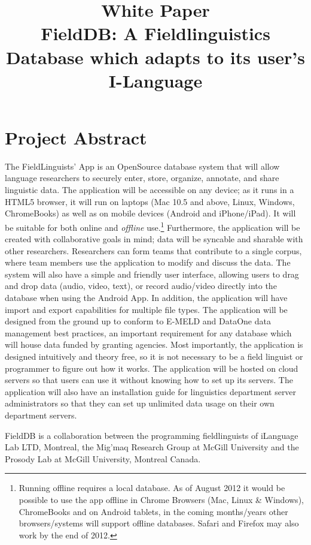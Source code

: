 \documentclass[12 pt]{article}
\title{White Paper \\ FieldDB: A Fieldlinguistics Database which adapts to its user's I-Language}
\author{}
\date{}
\begin{document}
\maketitle{} 

\tableofcontents

\section {Project Abstract}

The FieldLinguists' App is an OpenSource database system that will allow language researchers to securely enter, store, organize, annotate, and share linguistic data. The application will be accessible on any device; as it runs in a HTML5 browser, it will run on laptops (Mac  10.5 and above, Linux, Windows, ChromeBooks) as well as on mobile devices (Android and iPhone/iPad).  It will be suitable for both online and \emph{offline} use.\footnote{Running offline requires  a local database. As of August 2012 it would be possible to use the app offline in Chrome Browsers (Mac, Linux \& Windows), ChromeBooks and on Android tablets, in the coming months/years other browsers/systems will support offline databases. Safari and Firefox may also work by the end of 2012.}  Furthermore, the application will be created with collaborative goals in mind;  data will be syncable and sharable with other researchers.  Researchers can form teams that contribute to a single corpus, where team members use the application to modify and discuss the data. The system will also have a simple and friendly user interface, allowing users to drag and drop data (audio, video, text), or record audio/video directly into the database when using the Android App. In addition, the application will have import and export capabilities for multiple file types. The application will be designed from the ground up to conform to E-MELD and DataOne data management best practices, an important requirement for any database which will house data funded by granting agencies.  Most importantly, the application is designed intuitively and theory free, so it is not necessary to be a field linguist or programmer to figure out how it works. The application will be hosted on cloud servers so that users can use it without knowing how to set up its servers. The application will also have an installation guide for linguistics department server administrators so that they can set up unlimited data usage on their own department servers.


FieldDB is a collaboration between  the programming fieldlinguists of iLanguage Lab LTD, Montreal, the Mig'maq Research Group at McGill University and the Prosody Lab at McGill University, Montreal Canada.
\end{document}
